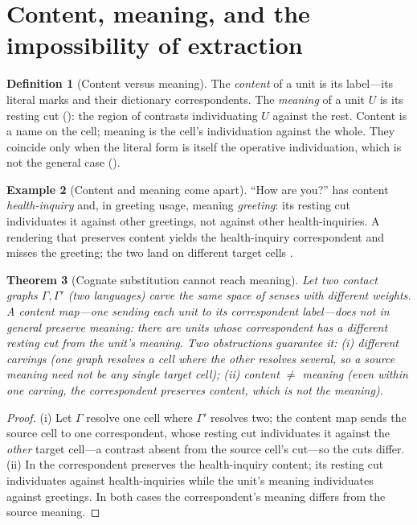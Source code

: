 \documentclass[twocolumn,11pt,a4paper]{article}
\theoremstyle{sup}
\newtheorem{theorem}{Theorem}[section]
\theoremstyle{definition}
\newtheorem{definition}[theorem]{Definition}
\newtheorem{example}[theorem]{Example}
\theoremstyle{remark}
\newcommand{\Gph}{\Gamma}
\begin{document}
\section{Content, meaning, and the impossibility of extraction}
\label{sec:meaning}

\begin{definition}[Content versus meaning]
\label{def:content}
The \emph{content} of a unit is its label---its literal marks and their
dictionary correspondents. The \emph{meaning} of a unit $U$ is its resting cut
(): the region of contrasts individuating $U$ against the rest.
Content is a name on the cell; meaning is the cell's individuation against the
whole. They coincide only when the literal form is itself the operative
individuation, which is not the general case ().
\end{definition}

\begin{example}[Content and meaning come apart]
\label{ex:greeting}
``How are you?'' has content \emph{health-inquiry} and, in greeting usage,
meaning \emph{greeting}: its resting cut individuates it against other
greetings, not against other health-inquiries. A rendering that preserves
content yields the health-inquiry correspondent and misses the greeting;
the two land on different target cells \citep{jakobson1959,nida1964}.
\end{example}

\begin{theorem}[Cognate substitution cannot reach meaning]
\label{thm:no-cognate}
Let two contact graphs $\Gph,\Gph'$ (two languages) carve the same space of
senses with different weights. A content map---one sending each unit to its
correspondent label---does not in general preserve meaning: there are units
whose correspondent has a different resting cut from the unit's meaning. Two
obstructions guarantee it: \textup{(i)} \emph{different carvings} (one graph
resolves a cell where the other resolves several, so a source meaning need not
be any single target cell); \textup{(ii)} \emph{content $\neq$ meaning} (even
within one carving, the correspondent preserves content, which is not the
meaning).
\end{theorem}

\begin{proof}
(i) Let $\Gph$ resolve one cell where $\Gph'$ resolves two; the content map
sends the source cell to one correspondent, whose resting cut individuates it
against the \emph{other} target cell---a contrast absent from the source cell's
cut---so the cuts differ. (ii) In  the correspondent preserves
the health-inquiry content; its resting cut individuates against
health-inquiries while the unit's meaning individuates against greetings. In
both cases the correspondent's meaning differs from the source meaning.
\end{proof}
\end{document}
